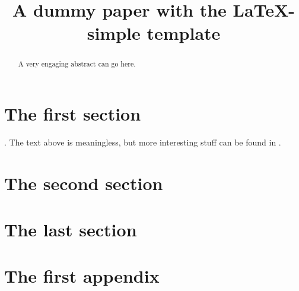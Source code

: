 \documentclass[11pt]{article}
\title{A dummy paper with the LaTeX-simple template}
\author[1]{\nameemail{Ada Lovelace}{ada@lovelace.com}}
\author[2,3]{\nameemail{Maria Mitchell}{maria@mitchell.com}}
\author[4]{\nameemail{Katherine Johnson}{katherine@johnson.com}}
\affil[1]{Ada's Institution}
\affil[2]{Maria's Institution 1}
\affil[3]{Maria's Institution 2}
\affil[4]{Katherine's Institution}
\begin{document}
\maketitle

\begin{abstract}
  A very engaging abstract can go here.
\end{abstract}

\section{The first section}

\blindtext. The text above is meaningless, but more interesting stuff can be found in \citet{mitchell2003venus}.

\section{The second section}

\blindtext[2]

\blinditemize

\blindtext

\section{The last section}

\blindmathfalse

\blindtext[2]

\begin{acknowledgements}
  \blindtext
\end{acknowledgements}








\vfill
\pagebreak
\appendix

\section{The first appendix}

\blindtext
\end{document}
